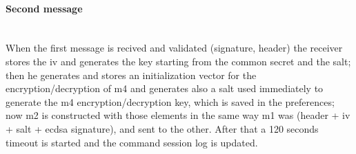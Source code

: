\paragraph{Second message}\hspace{0pt}\\
When the first message is recived and validated (signature, header) the receiver stores the iv and generates the key starting from the common secret and the salt; then he generates and stores an initialization vector for the encryption/decryption of m4 and generates also a salt used immediately to generate the m4 encryption/decryption key, which is saved in the preferences; now m2 is constructed with those elements in the same way m1 was (header + iv + salt + ecdsa signature), and sent to the other. After that a 120 seconds timeout is started and the command session log is updated.